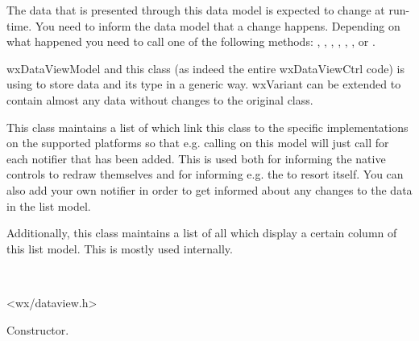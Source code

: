 The data that is presented through this data model is expected
to change at run-time. You need to inform the data model that
a change happens. Depending on what happened you need to call
one of the following methods: 
,
,
,
,
,
,
 or
.



wxDataViewModel and this class (as indeed the entire wxDataViewCtrl
code) is using  to store data and
its type in a generic way. wxVariant can be extended to contain
almost any data without changes to the original class.

This class maintains a list of 
which link this class to the specific implementations on the
supported platforms so that e.g. calling 
on this model will just call 
for each notifier that has been added. This is used both for
informing the native controls to redraw themselves and for informing
e.g. the 
to resort itself. You can also add your own notifier in order
to get informed about any changes to the data in the list model.

Additionally, this class maintains a list of all 
 which
display a certain column of this list model. This is
mostly used internally.


\\


<wx/dataview.h>


\label{wxdataviewlistmodelwxdataviewlistmodel}


Constructor.

